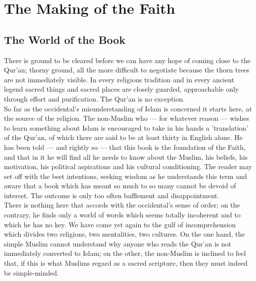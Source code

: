\documentclass[11pt, b5paper, twoside]{book}
\begin{document}
\part{The Making of the Faith}
\chapter{The World of the Book}


There is ground to be cleared before we can have any hope of coming close to the Qur'an; thorny 
ground, all the more difficult to negotiate because the thorn trees are not immediately visible. In 
every religious tradition and in every ancient legend sacred things and sacred places are closely 
guarded, approachable only through effort and purification. The Qur'an is no exception. \\

So far as the occidental's misunderstanding of Islam is concerned it starts here, at the source of 
the religion. The non-Muslim who --- for whatever reason --- wishes to learn something about Islam is 
encouraged to take in his hands a 'translation' of the Qur'an, of which there are said to be at least 
thirty in English alone. He has been told --- and rightly so --- that this book is the foundation of the 
Faith, and that in it he will find all he needs to know about the Muslim, his beliefs, his 
motivation, his political aspirations and his cultural conditioning. The reader may set off with the 
best intentions, seeking wisdom as he understands this term and aware that a book which has meant so 
much to so many cannot be devoid of interest. The outcome is only too often bafflement and 
disappointment. \\

There is nothing here that accords with the occidental's sense of order; on the contrary, he finds 
only a world of words which seems totally incoherent and to which he has no key. We have come yet 
again to the gulf of incomprehension which divides two religions, two mentalities, two cultures. On 
the one hand, the simple Muslim cannot understand why anyone who reads the Qur'an is not immediately 
converted to Islam; on the other, the non-Muslim is inclined to feel that, if this is what Muslims 
regard as a sacred scripture, then they must indeed be simple-minded. \\
\end{document}
